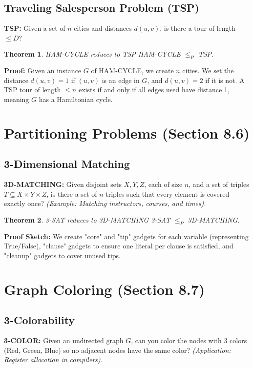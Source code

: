 \documentclass[12pt,a4paper]{report}
\newtheorem{theorem}{Theorem}
\begin{document}
\subsection{Traveling Salesperson Problem (TSP)}
\textbf{TSP:} Given a set of $n$ cities and distances $d(u,v)$, is there a tour of length $\leq D$?

\begin{theorem}{HAM-CYCLE reduces to TSP}{}
HAM-CYCLE $\leq_P$ TSP.
\end{theorem}
\textbf{Proof:} Given an instance $G$ of HAM-CYCLE, we create $n$ cities. We set the distance $d(u,v) = 1$ if $(u,v)$ is an edge in $G$, and $d(u,v) = 2$ if it is not. A TSP tour of length $\leq n$ exists if and only if all edges used have distance 1, meaning $G$ has a Hamiltonian cycle.

\section{Partitioning Problems (Section 8.6)}

\subsection{3-Dimensional Matching}
\textbf{3D-MATCHING:} Given disjoint sets $X, Y, Z$, each of size $n$, and a set of triples $T \subseteq X \times Y \times Z$, is there a set of $n$ triples such that every element is covered exactly once?
\textit{(Example: Matching instructors, courses, and times).}

\begin{theorem}{3-SAT reduces to 3D-MATCHING}{}
3-SAT $\leq_P$ 3D-MATCHING.
\end{theorem}
\textbf{Proof Sketch:} We create "core" and "tip" gadgets for each variable (representing True/False), "clause" gadgets to ensure one literal per clause is satisfied, and "cleanup" gadgets to cover unused tips.

\section{Graph Coloring (Section 8.7)}

\subsection{3-Colorability}
\textbf{3-COLOR:} Given an undirected graph $G$, can you color the nodes with 3 colors (Red, Green, Blue) so no adjacent nodes have the same color?
\textit{(Application: Register allocation in compilers).}
\end{document}
